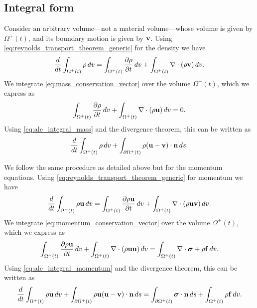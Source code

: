 \documentclass[oneside,a4paper,11pt]{report}
\begin{document}
\subsection{Integral form} 
Consider an arbitrary volume---not a material volume---whose volume is given by $\Omega^+(t)$, and its boundary motion is given by $\mathbf{v}$. Using \cref{eq:reynolds_transport_theorem_generic} for the density we have
\begin{equation}
\label{eq:ale_integral_mass}
    \frac{d}{dt} \int_{\Omega^+(t)} \rho \, dv = \int_{\Omega^+(t)} \frac{\partial \rho}{\partial t} \, dv + \int_{\Omega^+(t)} \nabla \cdot (\rho \mathbf{v}) \, dv.
\end{equation}
We integrate \cref{eq:mass_conservation_vector} over the volume $\Omega^+(t)$, which we express as
\begin{equation*}
    \int_{\Omega^+(t)} \frac{\partial \rho}{\partial t} \, dv + \int_{\Omega^+(t)} \nabla \cdot (\rho \mathbf{u}) \, dv = 0.
\end{equation*}
Using \cref{eq:ale_integral_mass} and the divergence theorem, this can be written as
\begin{equation}
    \label{eq:ale_integral_mass_conservation}
    \frac{d}{dt} \int_{\Omega^+(t)} \rho \, dv + \int_{\partial \Omega^+(t)} \rho (\mathbf{u} - \mathbf{v}) \cdot \mathbf{n} \, ds.
\end{equation}

We follow the same procedure as detailed above but for the momentum equations. Using \cref{eq:reynolds_transport_theorem_generic} for momentum we have
\begin{equation}
\label{eq:ale_integral_momentum}
    \frac{d}{dt} \int_{\Omega^+(t)} \rho \mathbf{u} \, dv = \int_{\Omega^+(t)} \frac{\partial \rho \mathbf{u}}{\partial t} \, dv + \int_{\Omega^+(t)} \nabla \cdot (\rho \mathbf{u} \mathbf{v}) \, dv.
\end{equation}
We integrate \cref{eq:momentum_conservation_vector} over the volume $\Omega^+(t)$, which we express as
\begin{equation*}
    \int_{\Omega^+(t)} \frac{\partial \rho \mathbf{u}}{\partial t} \, dv + \int_{\Omega^+(t)} \nabla \cdot (\rho \mathbf{u} \mathbf{u}) \, dv = \int_{\Omega^+(t)} \nabla \cdot \bm \sigma + \rho \mathbf{f} \, dv.
\end{equation*}
Using \cref{eq:ale_integral_momentum} and the divergence theorem, this can be written as
\begin{equation}
    \label{eq:ale_integral_momentum_conservation}
    \frac{d}{dt} \int_{\Omega^+(t)}  \rho \mathbf{u} \, dv + \int_{\partial \Omega^+(t)} \rho \mathbf{u} (\mathbf{u} - \mathbf{v}) \cdot \mathbf{n} \, ds = \int_{\partial \Omega^+(t)} \bm \sigma \cdot \mathbf{n} \, ds + \int_{\Omega^+(t)} \rho \mathbf{f} \, dv.
\end{equation}
\end{document}
